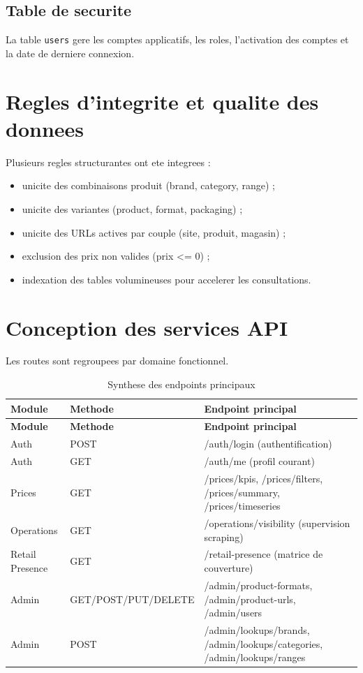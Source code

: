 \subsection{Table de securite}
La table \texttt{users} gere les comptes applicatifs, les roles, l'activation des comptes et la date de derniere connexion.


\section{Regles d'integrite et qualite des donnees}
Plusieurs regles structurantes ont ete integrees :
\begin{itemize}[leftmargin=1.2cm]
	\item unicite des combinaisons produit (brand, category, range) ;
	\item unicite des variantes (product, format, packaging) ;
	\item unicite des URLs actives par couple (site, produit, magasin) ;
	\item exclusion des prix non valides (prix <= 0) ;
	\item indexation des tables volumineuses pour accelerer les consultations.
\end{itemize}

\section{Conception des services API}
Les routes sont regroupees par domaine fonctionnel.

\begin{longtable}{p{2.7cm}p{2.0cm}p{8.4cm}}
\caption{Synthese des endpoints principaux}\label{tab:endpoints}\\
\toprule
\textbf{Module} & \textbf{Methode} & \textbf{Endpoint principal} \\
\midrule
\endfirsthead
\toprule
\textbf{Module} & \textbf{Methode} & \textbf{Endpoint principal} \\
\midrule
\endhead
Auth & POST & /auth/login (authentification) \\
Auth & GET & /auth/me (profil courant) \\
Prices & GET & /prices/kpis, /prices/filters, /prices/summary, /prices/timeseries \\
Operations & GET & /operations/visibility (supervision scraping) \\
Retail Presence & GET & /retail-presence (matrice de couverture) \\
Admin & GET/POST/PUT/DELETE & /admin/product-formats, /admin/product-urls, /admin/users \\
Admin & POST & /admin/lookups/brands, /admin/lookups/categories, /admin/lookups/ranges \\
\bottomrule
\end{longtable}

